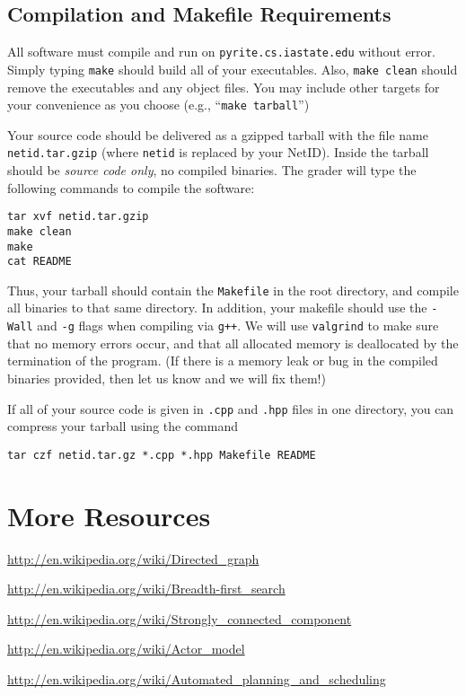 \documentclass[11pt]{article}
\begin{document}
\subsection{Compilation and Makefile Requirements}

All software must compile and run on \texttt{pyrite.cs.iastate.edu} without error.
Simply typing \texttt{make} should build all of your executables. 
Also, \texttt{make clean} should remove the executables and any object files. 
You may include other targets for your convenience as you choose (e.g., ``\texttt{make tarball}'')

Your source code should be delivered as a gzipped tarball with the file name \texttt{netid.tar.gzip} (where \texttt{netid} is replaced by your NetID).
Inside the tarball should be \emph{source code only}, no compiled binaries.
The grader will type the following commands to compile the software:

\begin{verbatim}
tar xvf netid.tar.gzip
make clean
make
cat README
\end{verbatim}

Thus, your tarball should contain the \texttt{Makefile} in the root directory, and compile all binaries to that same directory.
In addition, your makefile should use the \texttt{-Wall} and \texttt{-g} flags when compiling via \texttt{g++}.
We will use \texttt{valgrind} to make sure that no memory errors occur, and that all allocated memory is deallocated by the termination of the program.
(If there is a memory leak or bug in the compiled binaries provided, then let us know and we will fix them!)

If all of your source code is given in \texttt{.cpp} and \texttt{.hpp} files in one directory, you can compress your tarball using the command

\begin{center}
\texttt{tar czf netid.tar.gz *.cpp *.hpp Makefile README}
\end{center}


\section{More Resources}

\url{http://en.wikipedia.org/wiki/Directed_graph}

\url{http://en.wikipedia.org/wiki/Breadth-first_search}

\url{http://en.wikipedia.org/wiki/Strongly_connected_component}

\url{http://en.wikipedia.org/wiki/Actor_model}

\url{http://en.wikipedia.org/wiki/Automated_planning_and_scheduling}
\end{document}
